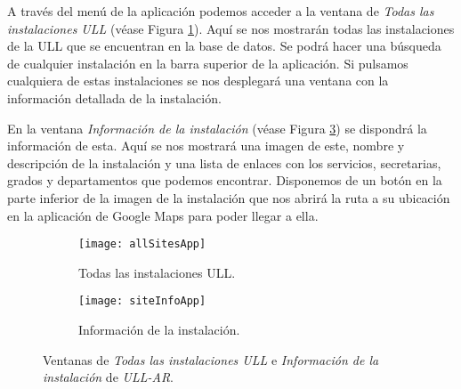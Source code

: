 
A través del menú de la aplicación podemos acceder a la ventana de \textit{Todas las instalaciones ULL} (véase Figura \ref{fig:allSitesApp}). Aquí se nos mostrarán todas las instalaciones de la ULL que se encuentran en la base de datos. Se podrá hacer una búsqueda de cualquier instalación en la barra superior de la aplicación. Si pulsamos cualquiera de estas instalaciones se nos desplegará una ventana con la información detallada de la instalación.

En la ventana \textit{Información de la instalación} (véase Figura \ref{fig:siteInfoApp}) se dispondrá la información de esta. Aquí se nos mostrará una imagen de este, nombre y descripción de la instalación y una lista de enlaces con los servicios, secretarias, grados y departamentos que podemos encontrar. Disponemos de un botón en la parte inferior de la imagen de la instalación que nos abrirá la ruta a su ubicación en la aplicación de Google Maps para poder llegar a ella.  
 
\begin{figure}[h]
    \hspace*{\fill}%
    \begin{subfigure}[h]{0.35\linewidth}
    \texttt{[image: allSitesApp]}
    \caption{Todas las instalaciones ULL.}
    \label{fig:allSitesApp}
    \end{subfigure}
    \hfill%
    \begin{subfigure}[h]{0.35\linewidth}
    \texttt{[image: siteInfoApp]}
    \caption{Información de la instalación.}
    \label{fig:siteInfoApp}
    \end{subfigure}%
    \caption{Ventanas de \textit{Todas las instalaciones ULL} e \textit{Información de la instalación} de \textit{ULL-AR}.}
    \hspace*{\fill}%
\end{figure}
 

